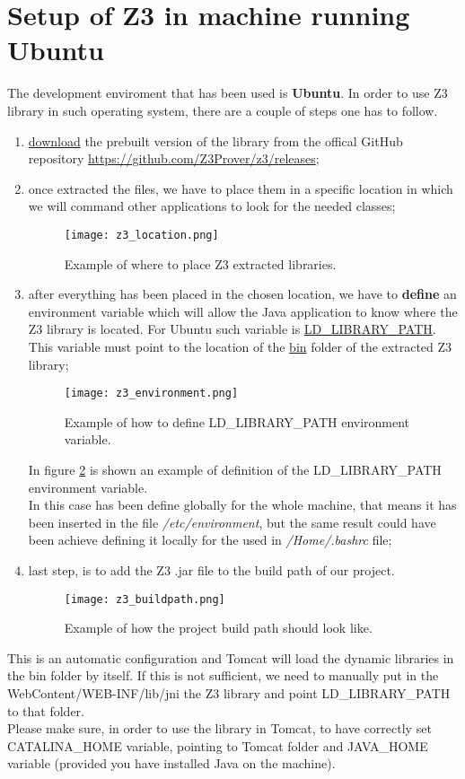 \section{Setup of Z3 in machine running Ubuntu}
The development enviroment that has been used is \textbf{Ubuntu}. In order to use Z3 library in such operating system, there are a couple of steps one has to follow.
\begin{enumerate}
  \item \underline{download} the prebuilt version of the library from the offical GitHub repository \url{https://github.com/Z3Prover/z3/releases};
  \item once extracted the files, we have to place them in a specific location in which we will command other applications to look for the needed classes;
  \begin{figure}[!htb]
     \centering
     \texttt{[image: z3\_location.png]}
     \caption{Example of where to place Z3 extracted libraries.}\label{Fig:Z3Location}
  \end{figure}
  \item after everything has been placed in the chosen location, we have to \textbf{define} an environment variable which will allow the Java application to know where the Z3 library is located. For Ubuntu such variable is \underline{LD\_LIBRARY\_PATH}. This variable must point to the location of the \underline{bin} folder of the extracted Z3 library;
  \begin{figure}[!htb]
     \centering
     \texttt{[image: z3\_environment.png]}
     \caption{Example of how to define LD\_LIBRARY\_PATH environment variable.}\label{Fig:Z3Environment}
  \end{figure}
  In figure \ref{Fig:Z3Environment} is shown an example of definition of the LD\_LIBRARY\_PATH environment variable. \\
  In this case has been define globally for the whole machine, that means it has been inserted in the file \textit{/etc/environment}, but the same result could have been achieve defining it locally for the used in \textit{/Home/.bashrc} file;
  \item last step, is to add the Z3 .jar file to the build path of our project.
  \begin{figure}[!htb]
     \centering
     \texttt{[image: z3\_buildpath.png]}
     \caption{Example of how the project build path should look like.}\label{Fig:Z3BuildPath}
  \end{figure}
\end{enumerate}
This is an automatic configuration and Tomcat will load the dynamic libraries in the bin folder by itself. If this is not sufficient, we need to manually put in the WebContent/WEB-INF/lib/jni the Z3 library and point LD\_LIBRARY\_PATH to that folder.\\
Please make sure, in order to use the library in Tomcat, to have correctly set CATALINA\_HOME variable, pointing to Tomcat folder and JAVA\_HOME variable (provided you have installed Java on the machine).

